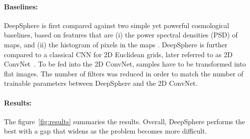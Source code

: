 \documentclass{article} %
\newcommand{\figref}[1]{figure~\ref{fig:#1}}
\newcommand{\1}{\b{1}}              %
\newcommand{\0}{\b{0}}              %
\begin{document}
\paragraph{Baselines:}
DeepSphere is first compared against two simple yet powerful cosmological baselines, based on features that are (i) the power spectral densities (PSD) of maps, and (ii) the histogram of pixels in the maps \citep{patton2017cosmologicalconstraints}.
DeepSphere is further compared to a classical CNN for 2D Euclidean grids, later referred to as 2D ConvNet~\cite{krachmalnicoff2019convolutional}.
To be fed into the 2D ConvNet, samples have to be transformed into flat images.
The number of filters was reduced in order to match the number of trainable parameters between DeepSphere and the 2D ConvNet.


\paragraph{Results:}
The \figref{results} summaries the results.
Overall, DeepSphere performs the best with a gap that widens as the problem becomes more difficult.
\end{document}
